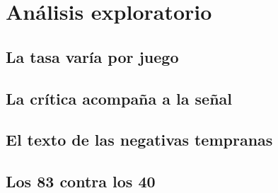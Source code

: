 \section{Análisis exploratorio}\label{sec:exploracion}

\subsection{La tasa varía por juego}

\subsection{La crítica acompaña a la señal}

\subsection{El texto de las negativas tempranas}

\subsection{Los 83 contra los 40}
